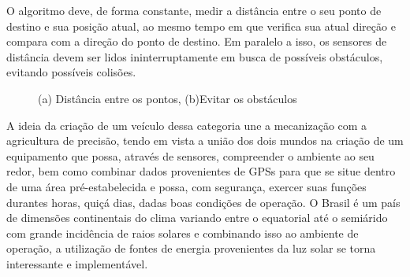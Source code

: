O algoritmo deve, de forma constante, medir a distância entre o seu ponto de destino e sua posição atual, ao mesmo tempo em que verifica sua atual direção e compara com a direção do ponto de destino. Em paralelo a isso, os sensores de distância devem ser lidos ininterruptamente em busca de possíveis obstáculos, evitando possíveis colisões. 
\begin{figure}[H]
    \begin{center}
    
        
      
    \end{center}
    \caption{%
        (a) Distância entre os pontos, (b)Evitar os obstáculos
     }%
\end{figure}



A ideia da criação de um veículo dessa categoria une a mecanização com a agricultura de precisão, tendo em vista a união dos dois mundos na criação de um equipamento que possa, através de sensores, compreender o ambiente ao seu redor, bem como combinar dados provenientes de GPSs para que se situe dentro de uma área pré-estabelecida e possa, com segurança, exercer suas funções durantes horas, quiçá dias, dadas boas condições de operação. O Brasil é um país de dimensões continentais do clima variando entre o equatorial até o semiárido com grande incidência de raios solares e combinando isso ao ambiente de operação, a utilização de fontes de energia provenientes da luz solar se torna interessante e implementável.


